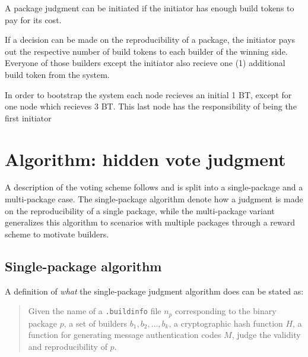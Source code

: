 \documentclass[english, biblatex, digitaloutput]{kththesis}
\begin{document}
A package judgment can be initiated if the initiator has enough build tokens to pay for its cost.

If a decision can be made on the reproducibility of a package, the initiator pays out the respective number of build tokens to each builder of the winning side. Everyone of those builders except the initiator also recieve one (1) additional build token from the system.

In order to bootstrap the system each node recieves an initial 1 BT, except for one node which recieves 3 BT. This last node has the responsibility of being the first initiator

\section{Algorithm: hidden vote judgment}

A description of the voting scheme follows and is split into a single-package and a multi-package case. The single-package algorithm denote how a judgment is made on the reproducibility of a single package, while the multi-package variant generalizes this algorithm to scenarios with multiple packages through a reward scheme to motivate builders.

\subsection{Single-package algorithm}

A definition of \textit{what} the single-package judgment algorithm does can be stated as:

\begin{quote}
	Given the name of a \texttt{.buildinfo} file $n_p$ corresponding to the binary package $p$, a set of builders $b_1, b_2, \dotsc, b_k$, a cryptographic hash function $H$, a function for generating message authentication codes $M$, judge the validity and reproducibility of $p$.
\end{quote}
\end{document}
